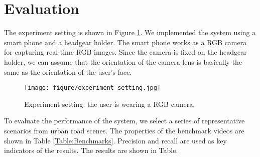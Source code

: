 \section{Evaluation}
The experiment setting is shown in Figure \ref*{fig:expset}. We implemented the system using a smart phone and a headgear holder. The smart phone works as a RGB camera for capturing real-time RGB images. Since the camera is fixed on the headgear holder, we can assume that the orientation of the camera lens is basically the same as the orientation of the user's face.


\begin{figure}[t]
	\begin{center}
		\texttt{[image: figure/experiment\_setting.jpg]}
	\end{center}
	\caption{Experiment setting: the user is wearing a RGB camera.}
	\label{fig:expset}
\end{figure}


To evaluate the performance of the system, we select a series of representative scenarios from urban road scenes. The properties of the benchmark videos are shown in Table \ref{Table:Benchmarks}. Precision and recall are used as key indicators of the results. The results are shown in Table.  


